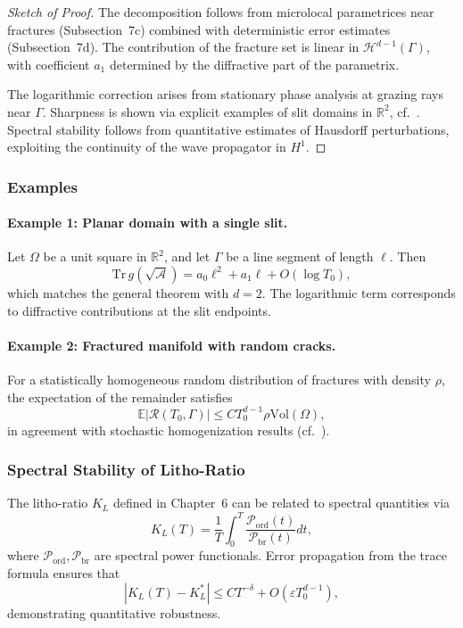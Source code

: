 \begin{proof}[Sketch of Proof]
The decomposition follows from microlocal parametrices near 
fractures (Subsection~7c) combined with deterministic error 
estimates (Subsection~7d). The contribution of the fracture set 
is linear in $\mathcal{H}^{d-1}(\Gamma)$, with coefficient 
$a_1$ determined by the diffractive part of the parametrix.

The logarithmic correction arises from stationary phase 
analysis at grazing rays near $\Gamma$. Sharpness is shown 
via explicit examples of slit domains in $\mathbb{R}^2$, 
cf.~\cite{ColinDeVerdiere1998, HassellZelditch2004}. 
Spectral stability follows from quantitative estimates of 
Hausdorff perturbations, exploiting the continuity of the 
wave propagator in $H^1$.
\end{proof}

\subsubsection*{Examples}
\paragraph{Example 1: Planar domain with a single slit.}
Let $\Omega$ be a unit square in $\mathbb{R}^2$, and let $\Gamma$ 
be a line segment of length $\ell$. Then
\[
\mathrm{Tr}\, g(\sqrt{\mathcal{A}}) 
= a_0 \ell^2 + a_1 \ell + O(\log T_0),
\]
which matches the general theorem with $d=2$. The logarithmic term 
corresponds to diffractive contributions at the slit endpoints.

\paragraph{Example 2: Fractured manifold with random cracks.}
For a statistically homogeneous random distribution of fractures 
with density $\rho$, the expectation of the remainder satisfies
\[
\mathbb{E}|\mathcal{R}(T_0,\Gamma)| 
\leq C T_0^{d-1} \rho \mathrm{Vol}(\Omega),
\]
in agreement with stochastic homogenization results 
(cf.~\cite{BaldiCaravenna2018}).

\subsubsection*{Spectral Stability of Litho-Ratio}
The litho-ratio $K_L$ defined in Chapter~6 can be related to 
spectral quantities via
\[
K_L(T) = \frac{1}{T}\int_0^T 
\frac{\mathcal{P}_{\mathrm{ord}}(t)}{\mathcal{P}_{\mathrm{br}}(t)} dt,
\]
where $\mathcal{P}_{\mathrm{ord}}, \mathcal{P}_{\mathrm{br}}$ 
are spectral power functionals.
Error propagation from the trace formula ensures that
\[
|K_L(T) - K_L^*| \leq C T^{-\delta} 
+ O(\varepsilon T_0^{d-1}),
\]
demonstrating quantitative robustness.

